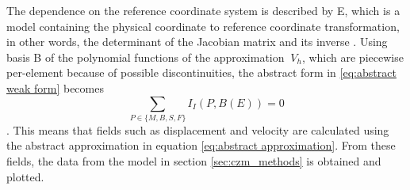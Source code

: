 
The dependence on the reference coordinate system is described by E, which is a model containing the physical coordinate to reference coordinate transformation, in other words, the determinant of the Jacobian matrix and its inverse \parencite{afanasievModularFlexibleSpectralelement2019}. Using basis B of the polynomial functions of the approximation $\ V_h$, which are piecewise per-element because of possible discontinuities, the abstract form in \ref{eq:abstract weak form} becomes \begin{equation}
  \sum_{P \in \{M,B,S,F\}} I_I(P,B(E)) = 0
  \label{eq:abstract approximation}
\end{equation} \parencite{afanasievModularFlexibleSpectralelement2019}. This means that fields such as displacement and velocity are calculated using the abstract approximation in equation \ref{eq:abstract approximation}. From these fields, the data from the model in section \ref{sec:czm_methods} is obtained and plotted. 

